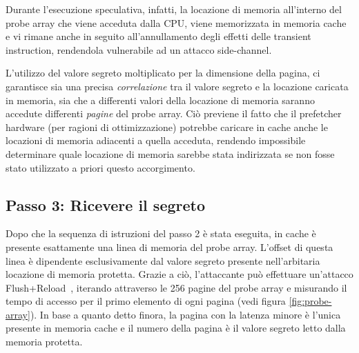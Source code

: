 Durante l'esecuzione speculativa, infatti, la locazione di memoria all'interno del probe array che viene acceduta dalla CPU, viene memorizzata in memoria cache e vi rimane anche in seguito all'annullamento degli effetti delle transient instruction, rendendola vulnerabile ad un attacco side-channel.

L'utilizzo del valore segreto moltiplicato per la dimensione della pagina, ci garantisce sia una precisa \emph{correlazione} tra il valore segreto e la locazione caricata in memoria, sia che a differenti valori della locazione di memoria saranno accedute differenti \emph{pagine} del probe array.
Ciò previene il fatto che il prefetcher hardware (per ragioni di ottimizzazione) potrebbe caricare in cache anche le locazioni di memoria adiacenti a quella acceduta, rendendo impossibile determinare quale locazione di memoria sarebbe stata indirizzata se non fosse stato utilizzato a priori questo accorgimento.

\subsection{Passo 3: Ricevere il segreto}
Dopo che la sequenza di istruzioni del passo 2 è stata eseguita, in cache è presente esattamente una linea di memoria del probe array.
L'offset di questa linea è dipendente esclusivamente dal valore segreto presente nell'arbitaria locazione di memoria protetta.
Grazie a ciò, l'attaccante può effettuare un'attacco Flush+Reload~\cite{yaron:flush-reload}, iterando attraverso le 256 pagine del probe array e misurando il tempo di accesso per il primo elemento di ogni pagina (vedi figura \vref{fig:probe-array}).
In base a quanto detto finora, la pagina con la latenza minore è l'unica presente in memoria cache e il numero della pagina è il valore segreto letto dalla memoria protetta.

